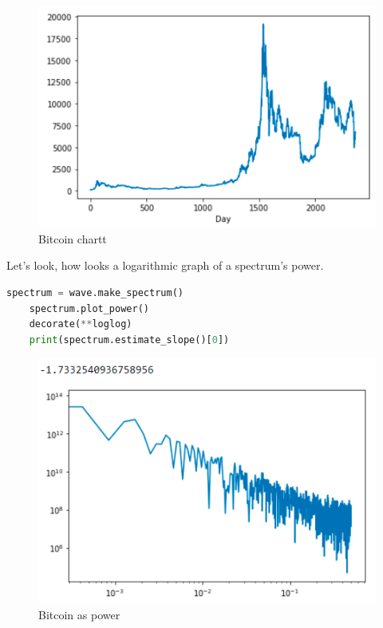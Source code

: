 \documentclass[a4paper]{article}
\begin{document}
        \begin{figure}[H]
            \centering
            \includegraphics[width=\textwidth]{img/bitcoin_chart.png}
            \caption{Bitcoin chartt}
            \label{fig:als_sqr}
        \end{figure}
        
        Let's look, how looks a logarithmic graph of a spectrum's power.
        
        \begin{lstlisting}[language=Python,caption=Bitcoin to a spectrum's power,label={lst:als_sqr}]
    spectrum = wave.make_spectrum()
    spectrum.plot_power()
    decorate(**loglog)
    print(spectrum.estimate_slope()[0])
        \end{lstlisting}
        
        \begin{figure}[H]
            \centering
            \includegraphics[width=\textwidth]{img/bitcoin_as_wave.png}
            \caption{Bitcoin as power}
            \label{fig:als_clr}
        \end{figure}
            
\end{document}

